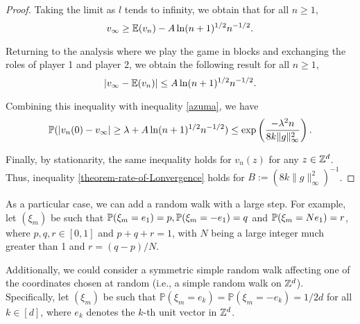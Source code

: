 \begin{proof}
	Taking the limit as $l$ tends to infinity, we obtain that for all $n \geq 1$,
	\[
		v_{\infty} \geq \mathbb{E}(v_n) - A\ln(n + 1)^{1/2}n^{-1/2}.
	\]
	
	Returning to the analysis where we play the game in blocks and exchanging the roles of player 1 and player 2, we obtain the following result for all $n \geq 1$,
	\[
		|v_{\infty} - \mathbb{E}(v_n)| \leq A\ln(n + 1)^{1/2}n^{-1/2}.
	\]

	Combining this inequality with inequality \eqref{azuma}, we have
	\[
		\mathbb{P}(|v_n(0) - v_{\infty}| \geq \lambda + A\ln(n+1)^{1/2}n^{-1/2}) \leq \exp\left(\frac{-\lambda^2n}{8k\|g\|_{\infty}^2}\right).
	\]
	
	Finally, by stationarity, the same inequality holds for $v_n(z)$ for any $z \in \mathbb{Z}^d$. Thus, inequality \eqref{theorem-rate-of-Lonvergence} holds for $B := (8k\|g\|_{\infty}^2)^{-1}$. 

	\end{proof}

	As a particular case, we can add a random walk with a large step. For example, let $(\xi_m)$ be such that $\mathbb{P}(\xi_m = e_1) = p, \mathbb{P}(\xi_m = -e_1) = q$ and $\mathbb{P}(\xi_m = Ne_1) = r$, where $p, q, r \in [0, 1]$ and $p + q + r = 1$, with $N$ being a large integer much greater than 1 and $r = (q - p)/N$.

	Additionally, we could consider a symmetric simple random walk affecting one of the coordinates chosen at random (i.e., a simple random walk on $\mathbb{Z}^d$). Specifically, let $(\xi_m)$ be such that $\mathbb{P}(\xi_m = e_k) = \mathbb{P}(\xi_m = -e_k) = 1/{2d}$ for all $k \in [d]$, where $e_k$ denotes the $k$-th unit vector in $\mathbb{Z}^d$.
